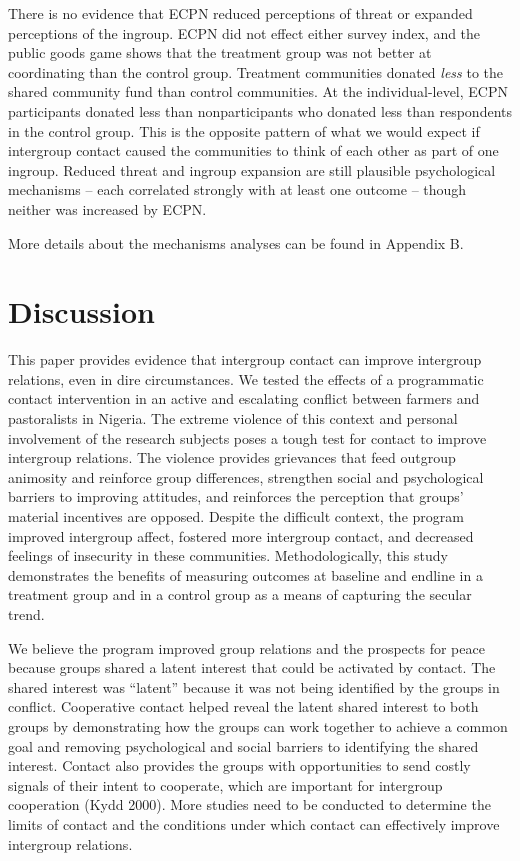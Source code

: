\documentclass[11pt]{article}
\begin{document}
There is no evidence that ECPN reduced perceptions of threat or expanded
perceptions of the ingroup. ECPN did not effect either survey index, and
the public goods game shows that the treatment group was not better at
coordinating than the control group. Treatment communities donated
\emph{less} to the shared community fund than control communities. At
the individual-level, ECPN participants donated less than
nonparticipants who donated less than respondents in the control group.
This is the opposite pattern of what we would expect if intergroup
contact caused the communities to think of each other as part of one
ingroup. Reduced threat and ingroup expansion are still plausible
psychological mechanisms -- each correlated strongly with at least one
outcome -- though neither was increased by ECPN.

More details about the mechanisms analyses can be found in Appendix B.

\hypertarget{discussion}{%
\section{Discussion}\label{discussion}}

This paper provides evidence that intergroup contact can improve
intergroup relations, even in dire circumstances. We tested the effects
of a programmatic contact intervention in an active and escalating
conflict between farmers and pastoralists in Nigeria. The extreme
violence of this context and personal involvement of the research
subjects poses a tough test for contact to improve intergroup relations.
The violence provides grievances that feed outgroup animosity and
reinforce group differences, strengthen social and psychological
barriers to improving attitudes, and reinforces the perception that
groups' material incentives are opposed. Despite the difficult context,
the program improved intergroup affect, fostered more intergroup
contact, and decreased feelings of insecurity in these communities.
Methodologically, this study demonstrates the benefits of measuring
outcomes at baseline and endline in a treatment group and in a control
group as a means of capturing the secular trend.

We believe the program improved group relations and the prospects for
peace because groups shared a latent interest that could be activated by
contact. The shared interest was ``latent'' because it was not being
identified by the groups in conflict. Cooperative contact helped reveal
the latent shared interest to both groups by demonstrating how the
groups can work together to achieve a common goal and removing
psychological and social barriers to identifying the shared interest.
Contact also provides the groups with opportunities to send costly
signals of their intent to cooperate, which are important for intergroup
cooperation (Kydd 2000). More studies need to be conducted to determine
the limits of contact and the conditions under which contact can
effectively improve intergroup relations.
\end{document}
